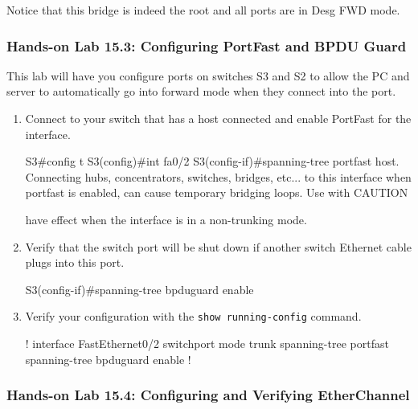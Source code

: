 Notice that this bridge is indeed the root and all ports are in Desg FWD
mode.

\subsubsection[Hands-on Lab 15.3: Configuring PortFast and BPDU
Guard]{\texorpdfstring{\protect\hypertarget{c15.xhtmlux5cux23c15-sec-27}{}{}Hands-on
Lab 15.3: Configuring PortFast and BPDU
Guard}{Hands-on Lab 15.3: Configuring PortFast and BPDU Guard}}

This lab will have you configure ports on switches S3 and S2 to allow
the PC and server to automatically go into forward mode when they
connect into the port.

\begin{enumerate}
\item
  Connect to your switch that has a host connected and enable PortFast
  for the interface.

\begin{cli}
S3#config t
S3(config)#int fa0/2
S3(config-if)#spanning-tree portfast
host. Connecting hubs, concentrators, switches, bridges, etc... to this
interface  when portfast is enabled, can cause temporary bridging loops.
Use with CAUTION
\end{cli}

\begin{cli}
 
have effect when the interface is in a non-trunking mode.
\end{cli}
\item
  Verify that the switch port will be shut down if another switch
  Ethernet cable plugs into this port.

\begin{cli}
S3(config-if)#spanning-tree bpduguard enable
\end{cli}
\item
  Verify your configuration with the \texttt{show\ running-config}
  command.

\begin{cli}
!
interface FastEthernet0/2
 switchport mode trunk
 spanning-tree portfast
 spanning-tree bpduguard enable
!
\end{cli}
\end{enumerate}

\subsubsection[Hands-on Lab 15.4: Configuring and Verifying
EtherChannel]{\texorpdfstring{\protect\hypertarget{c15.xhtmlux5cux23c15-sec-28}{}{}Hands-on
Lab 15.4: Configuring and Verifying
EtherChannel}{Hands-on Lab 15.4: Configuring and Verifying EtherChannel}}

